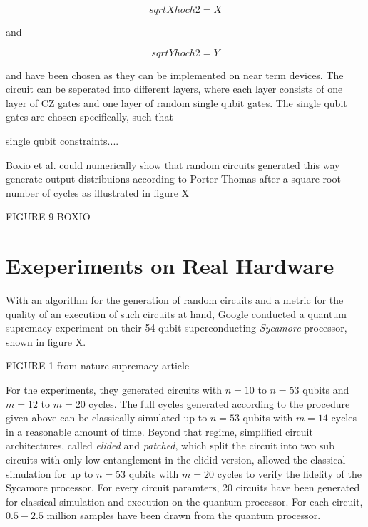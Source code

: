 \begin{equation}
 sqrtX hoch 2 = X
\end{equation}

and

\begin{equation}
  sqrtY hoch 2 = Y
\end{equation}

and have been chosen as they can be implemented on near term devices. The
circuit can be seperated into different layers, where each layer consists of one
layer of CZ gates and one layer of random single qubit gates. The single qubit
gates are chosen specifically, such that

\begin{enumerate}
  single qubit constraints....
\end{enumerate}


Boxio et al. could numerically show that random circuits generated this way
generate output distribuions according to Porter Thomas after a square root
number of cycles as illustrated in figure X

FIGURE 9 BOXIO

\section{Exeperiments on Real Hardware}

With an algorithm for the generation of random circuits and a metric for the
quality of an execution of such circuits at hand, Google conducted a quantum
supremacy experiment on their 54 qubit superconducting \textit{Sycamore}
processor, shown in figure X.

FIGURE 1 from nature supremacy article

For the experiments, they generated circuits with $n=10$ to $n=53$ qubits and
$m=12$ to $m=20$ cycles. The full cycles generated according to the procedure
given above can be classically simulated up to $n=53$ qubits with $m=14$ cycles
in a reasonable amount of time. Beyond that regime, simplified circuit
architectures, called \textit{elided} and \textit{patched}, which split the
circuit into two sub circuits with only low entanglement in the elidid version,
allowed the classical simulation for up to $n=53$ qubits with $m=20$ cycles to
verify the fidelity of the Sycamore processor. For every circuit paramters, 20
circuits have been generated for classical simulation and execution on the
quantum processor. For each circuit, $0.5-2.5$ million samples have been drawn
from the quantum processor.

